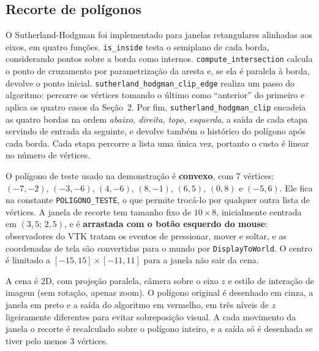 \subsection{Recorte de polígonos}
O Sutherland-Hodgman foi implementado para janelas retangulares alinhadas aos eixos, em quatro funções. \texttt{is\_inside} testa o semiplano de cada borda, considerando pontos sobre a borda como internos. \texttt{compute\_intersection} calcula o ponto de cruzamento por parametrização da aresta e, se ela é paralela à borda, devolve o ponto inicial. \texttt{sutherland\_hodgman\_clip\_edge} realiza um passo do algoritmo: percorre os vértices tomando o último como ``anterior'' do primeiro e aplica os quatro casos da Seção~2. Por fim, \texttt{sutherland\_hodgman\_clip} encadeia as quatro bordas na ordem \emph{abaixo, direita, topo, esquerda}, a saída de cada etapa servindo de entrada da seguinte, e devolve também o histórico do polígono após cada borda. Cada etapa percorre a lista uma única vez, portanto o custo é linear no número de vértices.

O polígono de teste usado na demonstração é \textbf{convexo}, com 7 vértices: $(-7,-2)$, $(-3,-6)$, $(4,-6)$, $(8,-1)$, $(6,5)$, $(0,8)$ e $(-5,6)$. Ele fica na constante \texttt{POLIGONO\_TESTE}, o que permite trocá-lo por qualquer outra lista de vértices. A janela de recorte tem tamanho fixo de $10\times8$, inicialmente centrada em $(3{,}5;\,2{,}5)$, e é \textbf{arrastada com o botão esquerdo do mouse}: observadores do VTK tratam os eventos de pressionar, mover e soltar, e as coordenadas de tela são convertidas para o mundo por \texttt{DisplayToWorld}. O centro é limitado a $[-15,15]\times[-11,11]$ para a janela não sair da cena.

A cena é 2D, com projeção paralela, câmera sobre o eixo $z$ e estilo de interação de imagem (sem rotação, apenas zoom). O polígono original é desenhado em cinza, a janela em preto e a saída do algoritmo em vermelho, em três níveis de $z$ ligeiramente diferentes para evitar sobreposição visual. A cada movimento da janela o recorte é recalculado sobre o polígono inteiro, e a saída só é desenhada se tiver pelo menos 3 vértices.